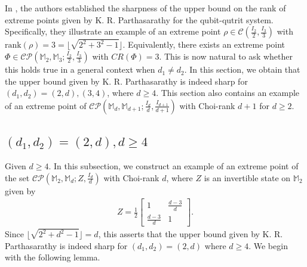 \documentclass[10pt,reqno]{amsart}
\theoremstyle{definition}
\theoremstyle{plain}
\theoremstyle{remark}
\newcommand{\mbb}[1]{\mathbb{#1}}
\newcommand{\msc}[1]{\mathscr{#1}}
\newcommand{\M}[1]{\mbb{M}_{#1}}%
\newcommand{\Matrix}[1]{\begin{bmatrix}#1\end{bmatrix}}
\numberwithin{equation}{section}%
\begin{document}
In \cite{KS21}, the authors established the sharpness of the upper bound on the rank of extreme points given by K. R. Parthasarathy for the qubit-qutrit system. Specifically, they illustrate an example of an extreme point $\rho\in\msc{C}(\frac{I_{2}}{2},\frac{I_{3}}{3})$ with $\text{rank}(\rho)=3=\lfloor{\sqrt{2^2+3^2-1}}\rfloor$. Equivalently, there exists an extreme point $\Phi\in\msc{CP}(\M{2}, \M{3}; \frac{I_2}{2}, \frac{I_3}{3})$ with $CR(\Phi)=3$. This is now natural to ask whether this holds true in a general context when $d_1\neq d_2$. In this section, we obtain that the upper bound given by K. R. Parthasarathy is indeed sharp for $(d_1,d_2)=(2,d), (3,4)$, where $d\geq 4$. This section also contains an example of an extreme point of $\msc{CP}(\M{d}, \M{d+1}; \frac{I_d}{d}, \frac{I_{d+1}}{d+1})$ with Choi-rank $d+1$ for $d\geq 2$. 



\begin{center}
	\item \subsection{$(d_1,d_2)=(2,d), d\geq 4$}
\end{center}


Given $d\geq 4$. In this subsection, we construct an example of an extreme point of the set $\msc{CP}(\M{2},\M{d}; Z, \frac{I_d}{d})$ with Choi-rank $d$, where $Z$ is an invertible state on $\M{2}$ given by
\begin{align}\label{definition of Z}
	 Z=\frac{1}{2}\Matrix{1&\frac{d-3}{d}\\\frac{d-3}{d}&1}.
\end{align}
Since $\lfloor{\sqrt{2^2+d^2-1}}\rfloor=d$, this asserts that the upper bound given by K. R. Parthasarathy is indeed sharp for $(d_1,d_2)=(2,d)$ where $d\geq 4$. We begin with the following lemma.
\end{document}
